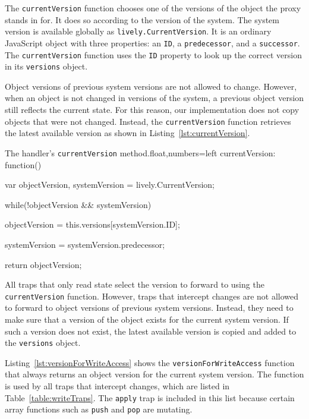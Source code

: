 The \lstinline{currentVersion} function chooses one of the versions of the object the proxy stands in for.
It does so according to the version of the system.
The system version is available globally as \lstinline{lively.CurrentVersion}.
It is an ordinary JavaScript object with three properties: an \lstinline{ID}, a \lstinline{predecessor}, and a \lstinline{successor}.
The \lstinline{currentVersion} function uses the \lstinline{ID} property to look up the correct version in its \lstinline{versions} object.

Object versions of previous system versions are not allowed to change.
However, when an object is not changed in versions of the system, a previous object version still reflects the current state.
For this reason, our implementation does not copy objects that were not changed.
Instead, the \lstinline{currentVersion} function retrieves the latest available version as shown in Listing~\ref{lst:currentVersion}.

\begin{code}{The handler's \lstinline{currentVersion} method.}{float,numbers=left}
currentVersion: function() {
    var objectVersion,
        systemVersion = lively.CurrentVersion;
    
    while(!objectVersion && systemVersion) {
        objectVersion = this.versions[systemVersion.ID];

        systemVersion = systemVersion.predecessor;
    }
    
    return objectVersion;
}
\end{code}
\iffalse
\end{verbatim}\fi

All traps that only read state select the version to forward to using the \lstinline{currentVersion} function.
However, traps that intercept changes are not allowed to forward to object versions of previous system versions.
Instead, they need to make sure that a version of the object exists for the current system version.
If such a version does not exist, the latest available version is copied and added to the \lstinline{versions} object.

Listing~\ref{lst:versionForWriteAccess} shows the \lstinline{versionForWriteAccess} function that always returns an object version for the current system version.
The function is used by all traps that intercept changes, which are listed in Table~\ref{table:writeTraps}.
The \lstinline{apply} trap is included in this list because certain array functions such as \lstinline{push} and \lstinline{pop} are mutating.

